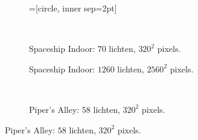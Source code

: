 \begin{figure}[t]
  \hspace{0.05\textwidth}%
  \begin{subfigure}[b]{\textwidth}
    =[circle, inner sep=2pt]
    
  \end{subfigure}\hfill\\
  \begin{adjustbox}{minipage=\textwidth, scale=0.55}
    \begin{subfigure}[b]{0.8\textwidth}
      \centering
      \def\svgwidth{\textwidth}
      
      \caption{Spaceship Indoor: $70$ lichten, $320^2$ pixels.}
      \label{fig:fds-test-frames:indoor-low}
    \end{subfigure}
  \end{adjustbox}\hspace{-0.075\textwidth} %
  \begin{adjustbox}{minipage=\textwidth, scale=0.55}
    \begin{subfigure}[b]{0.8\textwidth}
      \centering
      \def\svgwidth{\textwidth}
      
      \caption{Spaceship Indoor: $1260$ lichten, $2560^2$ pixels.}
      \label{fig:fds-test-frames:indoor-high}
    \end{subfigure}
  \end{adjustbox} \\
  \begin{adjustbox}{minipage=\textwidth, scale=0.55}
    \begin{subfigure}[b]{0.8\textwidth}
      \centering
      \def\svgwidth{\textwidth}
      
      \caption{Piper's Alley: $58$ lichten, $320^2$ pixels.}
      \label{fig:fds-test-frames:alley-low}
    \end{subfigure}
  \end{adjustbox}\hspace{-0.075\textwidth} %

\end{figure}
